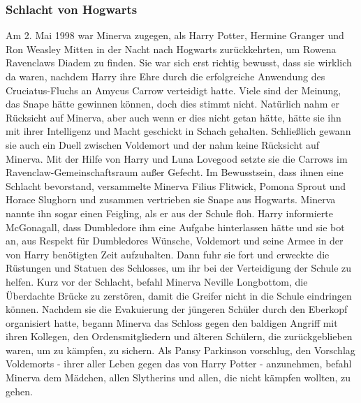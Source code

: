 \documentclass[a4paper, 10pt]{article}
\begin{document}
\subsubsection*{\large Schlacht von Hogwarts}
Am 2. Mai 1998 war Minerva zugegen, als Harry Potter, Hermine Granger und Ron Weasley Mitten in der Nacht nach Hogwarts zurückkehrten, um Rowena Ravenclaws Diadem zu finden. Sie war sich erst richtig bewusst, dass sie wirklich da waren, nachdem Harry ihre Ehre durch die erfolgreiche Anwendung des Cruciatus-Fluchs an Amycus Carrow verteidigt hatte.
\vspace{10pt}
\newline
{}  
Viele sind der Meinung, das Snape hätte gewinnen können, doch dies stimmt nicht.
\vspace{10pt}
\newline
{}  
Natürlich nahm er Rücksicht auf Minerva, aber auch wenn er dies nicht getan hätte, hätte sie ihn mit ihrer Intelligenz und Macht geschickt in Schach gehalten. Schließlich gewann sie auch ein Duell zwischen Voldemort und der nahm keine Rücksicht auf Minerva. Mit der Hilfe von Harry und Luna Lovegood setzte sie die Carrows im Ravenclaw-Gemeinschaftsraum außer Gefecht. Im Bewusstsein, dass ihnen eine Schlacht bevorstand, versammelte Minerva Filius Flitwick, Pomona Sprout und Horace Slughorn und zusammen vertrieben sie Snape aus Hogwarts. Minerva nannte ihn sogar einen Feigling, als er aus der Schule floh. Harry informierte McGonagall, dass Dumbledore ihm eine Aufgabe hinterlassen hätte und sie bot an, aus Respekt für Dumbledores Wünsche, Voldemort und seine Armee in der von Harry benötigten Zeit aufzuhalten. Dann fuhr sie fort und erweckte die Rüstungen und Statuen des Schlosses, um ihr bei der Verteidigung der Schule zu helfen. Kurz vor der Schlacht, befahl Minerva Neville Longbottom, die Überdachte Brücke zu zerstören, damit die Greifer nicht in die Schule eindringen können.
\vspace{10pt}
\newline
{}  
Nachdem sie die Evakuierung der jüngeren Schüler durch den Eberkopf organisiert hatte, begann Minerva das Schloss gegen den baldigen Angriff mit ihren Kollegen, den Ordensmitgliedern und älteren Schülern, die zurückgeblieben waren, um zu kämpfen, zu sichern. Als Pansy Parkinson vorschlug, den Vorschlag Voldemorts - ihrer aller Leben gegen das von Harry Potter - anzunehmen, befahl Minerva dem Mädchen, allen Slytherins und allen, die nicht kämpfen wollten, zu gehen.
\vspace{10pt}
\end{document}
